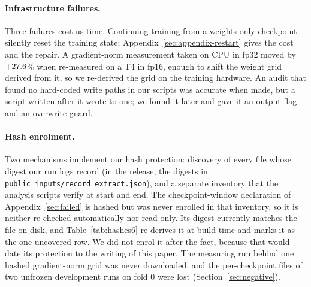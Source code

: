 \paragraph{Infrastructure failures.} Three failures cost us time. Continuing training from a
weights-only checkpoint silently reset the training state; Appendix~\ref{sec:appendix-restart}
gives the cost and the repair. A gradient-norm measurement taken on CPU in fp32 moved by
$+27.6{}$\% when re-measured on a T4 in fp16, enough to shift the weight grid derived
from it, so we re-derived the grid on the training hardware. An audit that found no
hard-coded write paths in our scripts was accurate when made, but a script written after it
wrote to one; we found it later and gave it an output flag and an overwrite guard.

\paragraph{Hash enrolment.} Two mechanisms implement our hash protection: discovery of every
file whose digest our run logs record (in the release, the digests in
\texttt{public\_inputs/\allowbreak record\_extract.json}), and a separate inventory that the
analysis scripts verify at
start and end. The checkpoint-window declaration of Appendix~\ref{sec:failed} is hashed but was
never enrolled in that inventory, so it is neither re-checked automatically nor read-only.
Its digest currently matches the file on disk, and Table~\ref{tab:hashes6} re-derives it at build
time and marks it as the one uncovered row. We did not enrol it after the fact, because that
would date its protection to the writing of this paper. The measuring run behind one hashed
gradient-norm grid was never downloaded, and the per-checkpoint files of two unfrozen
development runs on fold 0 were lost (Section~\ref{sec:negative}).

